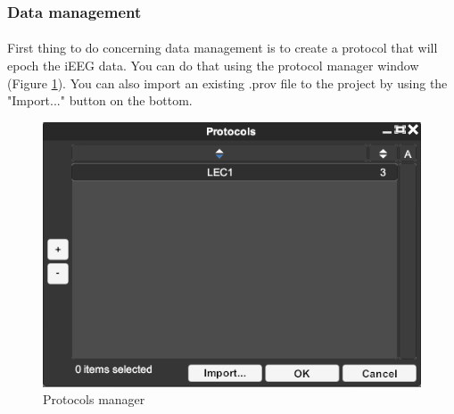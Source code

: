 \documentclass[a4paper]{article}
\begin{document}
\subsubsection{Data management}
\paragraph{} First thing to do concerning data management is to create a protocol that will epoch the iEEG data. You can do that using the protocol manager window (Figure \ref{protocolGestionUI}). You can also import an existing .prov file to the project by using the "Import..." button on the bottom.
\begin{figure}[H]
\begin{center}
\includegraphics[scale=0.5]{ProtocolGestion.png}
\end{center}
\caption{\label{protocolGestionUI}Protocols manager}
\end{figure}
\end{document}
